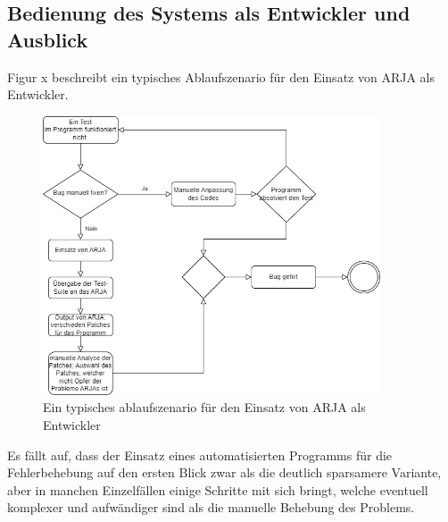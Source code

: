 \documentclass[11pt,a4paper]{article}
\begin{document}
\subsection{Bedienung des Systems als Entwickler und Ausblick}
Figur x beschreibt ein typisches Ablaufszenario für den Einsatz von ARJA als Entwickler.
\begin{figure}[h!]
\includegraphics[width=100mm,scale=0.3, center]{ablauf.png}
\caption{Ein typisches ablaufszenario für den Einsatz von ARJA als Entwickler}
\label{fig:figure4}
\end{figure}

Es fällt auf, dass der Einsatz eines automatisierten Programms für die Fehlerbehebung auf den ersten Blick zwar als die deutlich sparsamere Variante, aber in manchen Einzelfällen einige Schritte mit sich bringt, welche eventuell komplexer und aufwändiger sind als die manuelle Behebung des Problems. 
\end{document}
